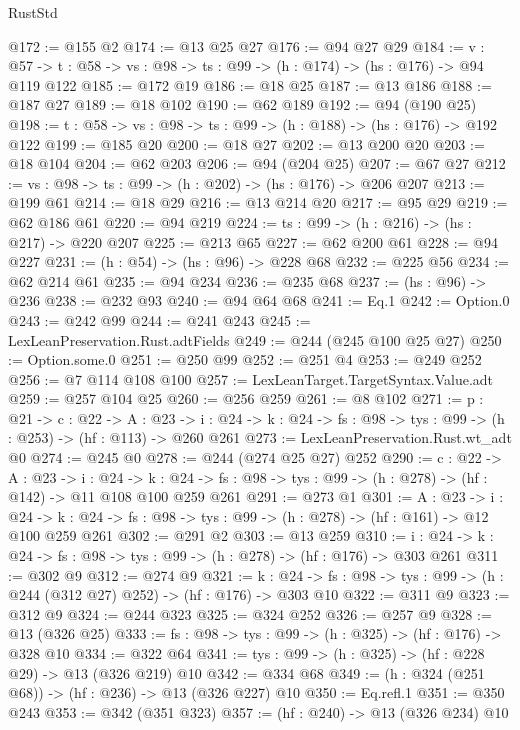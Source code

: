 \begin{lexlean}{RustStd}
\begin{coremodule}
@172 := @155 @2
@174 := @13 @25 @27
@176 := @94 @27 @29
@184 := {v : @57} ->
  {t : @58} -> {vs : @98} -> {ts : @99} -> (h : @174) -> (hs : @176) -> @94 @119 @122
@185 := @172 @19
@186 := @18 @25
@187 := @13 @186
@188 := @187 @27
@189 := @18 @102
@190 := @62 @189
@192 := @94 (@190 @25)
@198 := {t : @58} -> {vs : @98} -> {ts : @99} -> (h : @188) -> (hs : @176) -> @192 @122
@199 := @185 @20
@200 := @18 @27
@202 := @13 @200 @20
@203 := @18 @104
@204 := @62 @203
@206 := @94 (@204 @25)
@207 := @67 @27
@212 := {vs : @98} -> {ts : @99} -> (h : @202) -> (hs : @176) -> @206 @207
@213 := @199 @61
@214 := @18 @29
@216 := @13 @214 @20
@217 := @95 @29
@219 := @62 @186 @61
@220 := @94 @219
@224 := {ts : @99} -> (h : @216) -> (hs : @217) -> @220 @207
@225 := @213 @65
@227 := @62 @200 @61
@228 := @94 @227
@231 := (h : @54) -> (hs : @96) -> @228 @68
@232 := @225 @56
@234 := @62 @214 @61
@235 := @94 @234
@236 := @235 @68
@237 := (hs : @96) -> @236
@238 := @232 @93
@240 := @94 @64 @68
@241 := Eq.{1}
@242 := Option.{0}
@243 := @242 @99
@244 := @241 @243
@245 := LexLeanPreservation.Rust.adtFields
@249 := @244 (@245 @100 @25 @27)
@250 := Option.some.{0}
@251 := @250 @99
@252 := @251 @4
@253 := @249 @252
@256 := @7 @114 @108 @100
@257 := LexLeanTarget.TargetSyntax.Value.adt
@259 := @257 @104 @25
@260 := @256 @259
@261 := @8 @102
@271 := {p : @21} ->
  {c : @22} ->
  {A : @23} ->
  {i : @24} -> {k : @24} -> {fs : @98} -> {tys : @99} -> (h : @253) -> (hf : @113) -> @260 @261
@273 := LexLeanPreservation.Rust.wt_adt @0
@274 := @245 @0
@278 := @244 (@274 @25 @27) @252
@290 := {c : @22} ->
  {A : @23} ->
  {i : @24} ->
  {k : @24} -> {fs : @98} -> {tys : @99} -> (h : @278) -> (hf : @142) -> @11 @108 @100 @259 @261
@291 := @273 @1
@301 := {A : @23} ->
  {i : @24} ->
  {k : @24} -> {fs : @98} -> {tys : @99} -> (h : @278) -> (hf : @161) -> @12 @100 @259 @261
@302 := @291 @2
@303 := @13 @259
@310 := {i : @24} ->
  {k : @24} -> {fs : @98} -> {tys : @99} -> (h : @278) -> (hf : @176) -> @303 @261
@311 := @302 @9
@312 := @274 @9
@321 := {k : @24} ->
  {fs : @98} -> {tys : @99} -> (h : @244 (@312 @27) @252) -> (hf : @176) -> @303 @10
@322 := @311 @9
@323 := @312 @9
@324 := @244 @323
@325 := @324 @252
@326 := @257 @9
@328 := @13 (@326 @25)
@333 := {fs : @98} -> {tys : @99} -> (h : @325) -> (hf : @176) -> @328 @10
@334 := @322 @64
@341 := {tys : @99} -> (h : @325) -> (hf : @228 @29) -> @13 (@326 @219) @10
@342 := @334 @68
@349 := (h : @324 (@251 @68)) -> (hf : @236) -> @13 (@326 @227) @10
@350 := Eq.refl.{1}
@351 := @350 @243
@353 := @342 (@351 @323)
@357 := (hf : @240) -> @13 (@326 @234) @10

\end{coremodule}
\end{lexlean}
